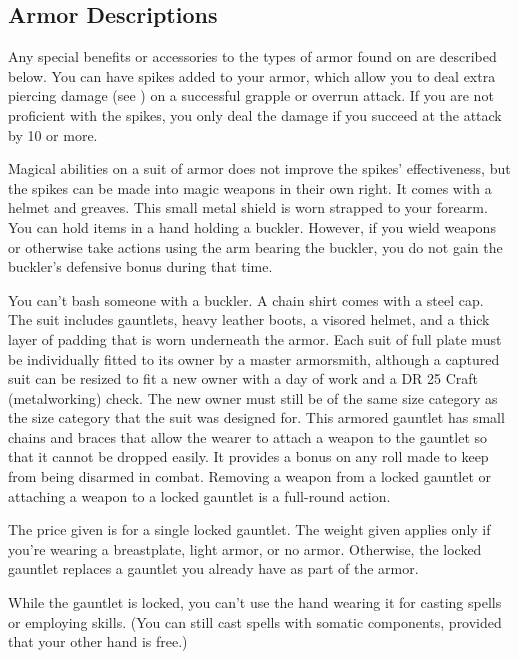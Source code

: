 \subsection{Armor Descriptions}
Any special benefits or accessories to the types of armor found on  are described below.
 You can have spikes added to your armor, which allow you to deal extra piercing damage (see ) on a successful grapple or overrun attack. If you are not proficient with the spikes, you only deal the damage if you succeed at the attack by 10 or more.
\par Magical abilities on a suit of armor does not improve the spikes' effectiveness, but the spikes can be made into magic weapons in their own right.
 It comes with a helmet and greaves.
 This small metal shield is worn strapped to your forearm.
You can hold items in a hand holding a buckler.
However, if you wield weapons or otherwise take actions using the arm bearing the buckler, you do not gain the buckler's defensive bonus during that time.
\par You can't bash someone with a buckler.
 A chain shirt comes with a steel cap.
 The suit includes gauntlets, heavy leather boots, a visored helmet, and a thick layer of padding that is worn underneath the armor. Each suit of full plate must be individually fitted to its owner by a master armorsmith, although a captured suit can be resized to fit a new owner with a day of work and a DR 25 Craft (metalworking) check. The new owner must still be of the same size category as the size category that the suit was designed for.
 This armored gauntlet has small chains and braces that allow the wearer to attach a weapon to the gauntlet so that it cannot be dropped easily. It provides a  bonus on any roll made to keep from being disarmed in combat. Removing a weapon from a locked gauntlet or attaching a weapon to a locked gauntlet is a full-round action.
\par The price given is for a single locked gauntlet. The weight given applies only if you're wearing a breastplate, light armor, or no armor. Otherwise, the locked gauntlet replaces a gauntlet you already have as part of the armor.
\par While the gauntlet is locked, you can't use the hand wearing it for casting spells or employing skills. (You can still cast spells with somatic components, provided that your other hand is free.)
